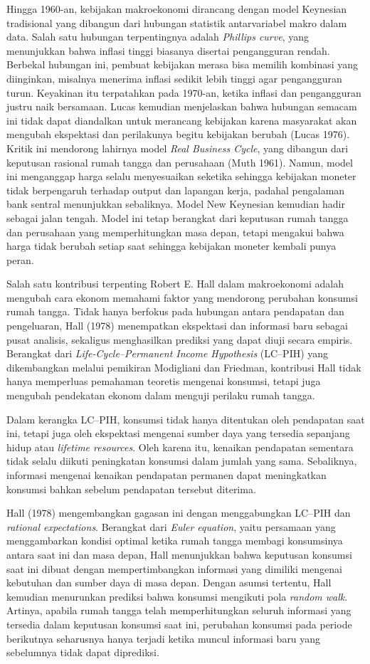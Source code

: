\documentclass[
  manuscript=article,
  layout=brief,
  year=2026,
  volume=1,
]{den}
\begin{document}
Hingga 1960-an, kebijakan makroekonomi dirancang dengan model Keynesian
tradisional yang dibangun dari hubungan statistik antarvariabel makro
dalam data. Salah satu hubungan terpentingnya adalah \emph{Phillips
curve}, yang menunjukkan bahwa inflasi tinggi biasanya disertai
pengangguran rendah. Berbekal hubungan ini, pembuat kebijakan merasa
bisa memilih kombinasi yang diinginkan, misalnya menerima inflasi
sedikit lebih tinggi agar pengangguran turun. Keyakinan itu terpatahkan
pada 1970-an, ketika inflasi dan pengangguran justru naik bersamaan.
Lucas kemudian menjelaskan bahwa hubungan semacam ini tidak dapat
diandalkan untuk merancang kebijakan karena masyarakat akan mengubah
ekspektasi dan perilakunya begitu kebijakan berubah (Lucas 1976). Kritik
ini mendorong lahirnya model \emph{Real Business Cycle}, yang dibangun
dari keputusan rasional rumah tangga dan perusahaan (Muth 1961). Namun,
model ini menganggap harga selalu menyesuaikan seketika sehingga
kebijakan moneter tidak berpengaruh terhadap output dan lapangan kerja,
padahal pengalaman bank sentral menunjukkan sebaliknya. Model New
Keynesian kemudian hadir sebagai jalan tengah. Model ini tetap berangkat
dari keputusan rumah tangga dan perusahaan yang memperhitungkan masa
depan, tetapi mengakui bahwa harga tidak berubah setiap saat sehingga
kebijakan moneter kembali punya peran.

Salah satu kontribusi terpenting Robert E. Hall dalam makroekonomi
adalah mengubah cara ekonom memahami faktor yang mendorong perubahan
konsumsi rumah tangga. Tidak hanya berfokus pada hubungan antara
pendapatan dan pengeluaran, Hall (1978) menempatkan ekspektasi dan
informasi baru sebagai pusat analisis, sekaligus menghasilkan prediksi
yang dapat diuji secara empiris. Berangkat dari
\emph{Life-Cycle--Permanent Income Hypothesis} (LC--PIH) yang
dikembangkan melalui pemikiran Modigliani dan Friedman, kontribusi Hall
tidak hanya memperluas pemahaman teoretis mengenai konsumsi, tetapi juga
mengubah pendekatan ekonom dalam menguji perilaku rumah tangga.

Dalam kerangka LC--PIH, konsumsi tidak hanya ditentukan oleh pendapatan
saat ini, tetapi juga oleh ekspektasi mengenai sumber daya yang tersedia
sepanjang hidup atau \emph{lifetime resources}. Oleh karena itu,
kenaikan pendapatan sementara tidak selalu diikuti peningkatan konsumsi
dalam jumlah yang sama. Sebaliknya, informasi mengenai kenaikan
pendapatan permanen dapat meningkatkan konsumsi bahkan sebelum
pendapatan tersebut diterima.

Hall (1978) mengembangkan gagasan ini dengan menggabungkan LC--PIH dan
\emph{rational expectations}. Berangkat dari \emph{Euler equation},
yaitu persamaan yang menggambarkan kondisi optimal ketika rumah tangga
membagi konsumsinya antara saat ini dan masa depan, Hall menunjukkan
bahwa keputusan konsumsi saat ini dibuat dengan mempertimbangkan
informasi yang dimiliki mengenai kebutuhan dan sumber daya di masa
depan. Dengan asumsi tertentu, Hall kemudian menurunkan prediksi bahwa
konsumsi mengikuti pola \emph{random walk}. Artinya, apabila rumah
tangga telah memperhitungkan seluruh informasi yang tersedia dalam
keputusan konsumsi saat ini, perubahan konsumsi pada periode berikutnya
seharusnya hanya terjadi ketika muncul informasi baru yang sebelumnya
tidak dapat diprediksi.
\end{document}

